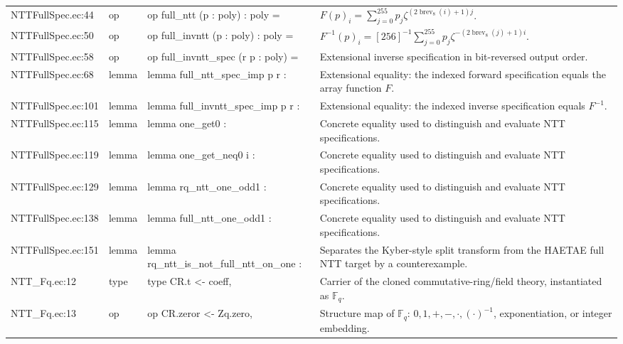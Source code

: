 \documentclass[10pt]{article}
\begin{document}
\begin{longtable}{L{0.11\textwidth}L{0.05\textwidth}L{0.38\textwidth}L{0.42\textwidth}}
NTTFullSpec.\allowbreak{}ec:\allowbreak{}44 & op & {\ttfamily\scriptsize op full\_ntt (p : poly) : poly =} & $F(p)_i=\sum_{j=0}^{255}p_j\zeta^{(2\operatorname{brev}_8(i)+1)j}$. \\
NTTFullSpec.\allowbreak{}ec:\allowbreak{}50 & op & {\ttfamily\scriptsize op full\_invntt (p : poly) : poly =} & $F^{-1}(p)_i=[256]^{-1}\sum_{j=0}^{255}p_j\zeta^{-(2\operatorname{brev}_8(j)+1)i}$. \\
NTTFullSpec.\allowbreak{}ec:\allowbreak{}58 & op & {\ttfamily\scriptsize op full\_invntt\_spec (r p : poly) =} & Extensional inverse specification in bit-reversed output order. \\
NTTFullSpec.\allowbreak{}ec:\allowbreak{}68 & lemma & {\ttfamily\scriptsize lemma full\_ntt\_spec\_imp p r :} & Extensional equality: the indexed forward specification equals the array function $F$. \\
NTTFullSpec.\allowbreak{}ec:\allowbreak{}101 & lemma & {\ttfamily\scriptsize lemma full\_invntt\_spec\_imp p r :} & Extensional equality: the indexed inverse specification equals $F^{-1}$. \\
NTTFullSpec.\allowbreak{}ec:\allowbreak{}115 & lemma & {\ttfamily\scriptsize lemma one\_get0 :} & Concrete equality used to distinguish and evaluate NTT specifications. \\
NTTFullSpec.\allowbreak{}ec:\allowbreak{}119 & lemma & {\ttfamily\scriptsize lemma one\_get\_neq0 i :} & Concrete equality used to distinguish and evaluate NTT specifications. \\
NTTFullSpec.\allowbreak{}ec:\allowbreak{}129 & lemma & {\ttfamily\scriptsize lemma rq\_ntt\_one\_odd1 :} & Concrete equality used to distinguish and evaluate NTT specifications. \\
NTTFullSpec.\allowbreak{}ec:\allowbreak{}138 & lemma & {\ttfamily\scriptsize lemma full\_ntt\_one\_odd1 :} & Concrete equality used to distinguish and evaluate NTT specifications. \\
NTTFullSpec.\allowbreak{}ec:\allowbreak{}151 & lemma & {\ttfamily\scriptsize lemma rq\_ntt\_is\_not\_full\_ntt\_on\_one :} & Separates the Kyber-style split transform from the HAETAE full NTT target by a counterexample. \\
NTT\_Fq.\allowbreak{}ec:\allowbreak{}12 & type & {\ttfamily\scriptsize type CR.t <- coeff,} & Carrier of the cloned commutative-ring/field theory, instantiated as $\mathbb F_q$. \\
NTT\_Fq.\allowbreak{}ec:\allowbreak{}13 & op & {\ttfamily\scriptsize op CR.zeror <- Zq.zero,} & Structure map of $\mathbb F_q$: $0,1,+,-,\cdot,(\cdot)^{-1}$, exponentiation, or integer embedding. \\

\end{longtable}
\end{document}

